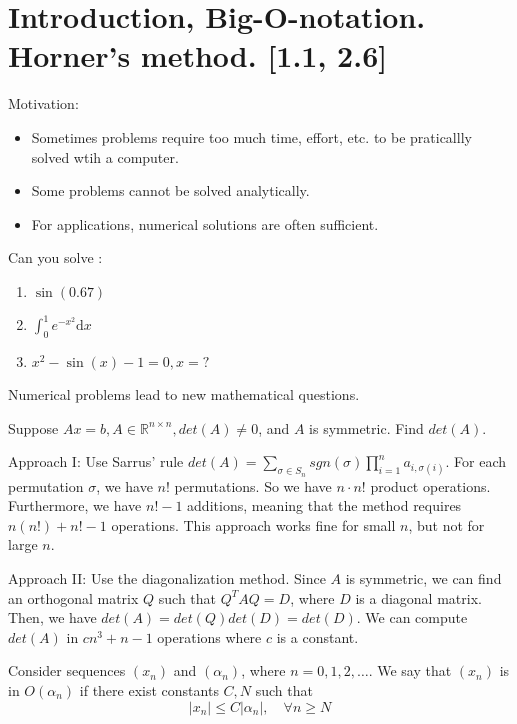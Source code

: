 \documentclass[main.tex]{subfiles}
\begin{document}
\pagestyle{plain}

\chapter{Introduction, Big-O-notation. Horner's method. [1.1, 2.6]}
\label{chap:chapter1}
\par Motivation: 
\begin{itemize}
    \item Sometimes problems require too much time, effort, etc. to be  praticallly solved wtih a computer. 
    \item Some problems cannot be solved analytically. 
    \item For applications, numerical solutions are often sufficient.  
\end{itemize}
\begin{example}
    Can you solve :
    \begin{enumerate}
        \item $\sin(0.67)$
        \item $\displaystyle \int_{0}^{1} e^{-x^2} \mathrm{d} x $
        \item $x^2 - \sin(x) - 1 = 0, x = ?$
    \end{enumerate}
\end{example}
\par Numerical problems lead to new mathematical questions. 
\begin{example}
    Suppose $Ax = b, A\in \mathbb{R}^{n \times n}, det(A)\neq 0$, and $A$ is symmetric. Find $det(A)$. 
    \par Approach I: Use Sarrus' rule $det(A) = \sum_{\sigma \in S_n} sgn(\sigma) \prod_{i=1}^{n} a_{i, \sigma(i)}$. For each permutation $\sigma$, we have $n!$ permutations. So we have $n \cdot n!$ product operations. Furthermore, we have $n! - 1$ additions, meaning that the method requires $n(n!) + n! - 1$ operations. This approach works fine for small $n$, but not for large $n$. 
    \par Approach II: Use the diagonalization method. Since $A$ is symmetric, we can find an orthogonal matrix $Q$ such that $Q^T A Q = D$, where $D$ is a diagonal matrix. Then, we have $det(A) = det(Q) det(D) = det(D)$. We can compute $det(A)$ in $cn^3 + n - 1$ operations where $c$ is a constant.
\end{example}

\begin{definition}
    Consider sequences $(x_n)$ and $(\alpha_n)$, where $n = 0, 1, 2, \ldots$. We say that $(x_n)$ is in $O(\alpha_n)$ if there exist constants $C, N$ such that
    \[
        |x_n| \leq C |\alpha_n|, \quad \forall n \geq N
    \]
\end{definition}
\end{document}
